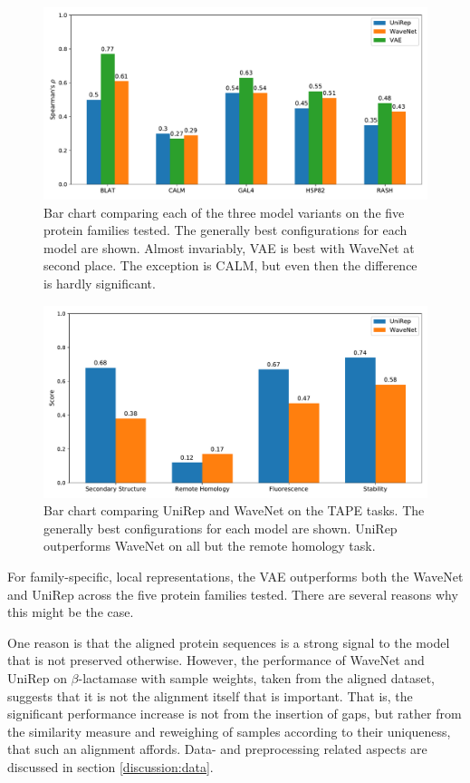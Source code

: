\begin{figure}[H]
    \centering
    \includegraphics[width = 0.9\linewidth]{report/figures/MEP_barchart.pdf}
    \caption{Bar chart comparing each of the three model variants on the five protein families tested. The generally best configurations for each model are shown. Almost invariably, VAE is best with WaveNet at second place. The exception is CALM, but even then the difference is hardly significant.}
    \label{fig:MEP_barchart}
\end{figure}

\begin{figure}[H]
    \centering
    \includegraphics[width=0.9\linewidth]{report/figures/TAPE_barchart.pdf}
    \caption{Bar chart comparing UniRep and WaveNet on the TAPE tasks. The generally best configurations for each model are shown. UniRep outperforms WaveNet on all but the remote homology task.}
    \label{fig:TAPE_barchart}
\end{figure}

For family-specific, local representations, the VAE outperforms both the WaveNet and UniRep across the five protein families tested. There are several reasons why this might be the case.

One reason is that the aligned protein sequences is a strong signal to the model that is not preserved otherwise. However, the performance of WaveNet and UniRep on $\beta$-lactamase with sample weights, taken from the aligned dataset, suggests that it is not the alignment itself that is important. That is, the significant performance increase is not from the insertion of gaps, but rather from the similarity measure and reweighing of samples according to their uniqueness, that such an alignment affords. Data- and preprocessing related aspects are discussed in section \ref{discussion:data}.

